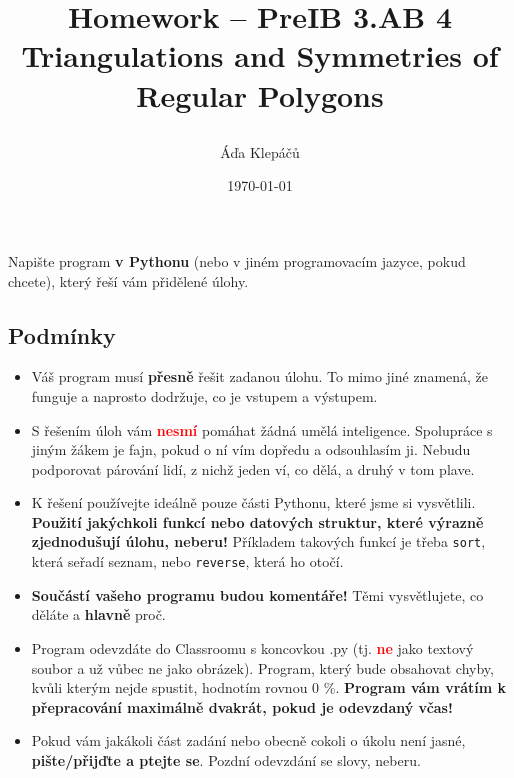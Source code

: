 \documentclass[a4paper,11pt]{article}
\title{\Huge\textsf{Homework -- PreIB 3.AB 4}\\
 \Large\textsf{Triangulations and Symmetries of Regular Polygons}
 \author{Áďa Klepáčů}
 \date{\today}
}
\newcommand{\clr}{\textcolor{red}}
\begin{document}
\thispagestyle{fancy}

Napište program \textbf{v Pythonu} (nebo v jiném programovacím jazyce, pokud
chcete), který řeší vám přidělené úlohy.

\subsection*{Podmínky}
\begin{itemize}
 \item Váš program musí \textbf{přesně} řešit zadanou úlohu. To mimo jiné
  znamená, že funguje a naprosto dodržuje, co je vstupem a výstupem.
 \item S řešením úloh vám \textbf{\clr{nesmí}} pomáhat žádná umělá inteligence.
  Spolupráce s jiným žákem je fajn, pokud o ní vím dopředu a odsouhlasím ji.
  Nebudu podporovat párování lidí, z nichž jeden ví, co dělá, a druhý v tom
  plave.
 \item K řešení používejte ideálně pouze části Pythonu, které jsme si
  vysvětlili. \textbf{Použití jakýchkoli funkcí nebo datových struktur, které
  výrazně zjednodušují úlohu, neberu!} Příkladem takových funkcí je třeba
  \texttt{sort}, která seřadí seznam, nebo \texttt{reverse}, která ho otočí.
 \item \textbf{Součástí vašeho programu budou komentáře!} Těmi vysvětlujete, co
  děláte a \textbf{hlavně} proč.
 \item Program odevzdáte do Classroomu s koncovkou .py (tj. \textbf{\clr{ne}}
  jako textový soubor a už vůbec ne jako obrázek). Program, který bude obsahovat
  chyby, kvůli kterým nejde spustit, hodnotím rovnou 0 \%. \textbf{Program vám
  vrátím k přepracování maximálně dvakrát, pokud je odevzdaný včas!}
 \item Pokud vám jakákoli část zadání nebo obecně cokoli o úkolu není jasné,
  \textbf{pište/přijďte a ptejte se}. Pozdní odevzdání se slovy,  neberu.
\end{itemize}
\end{document}

